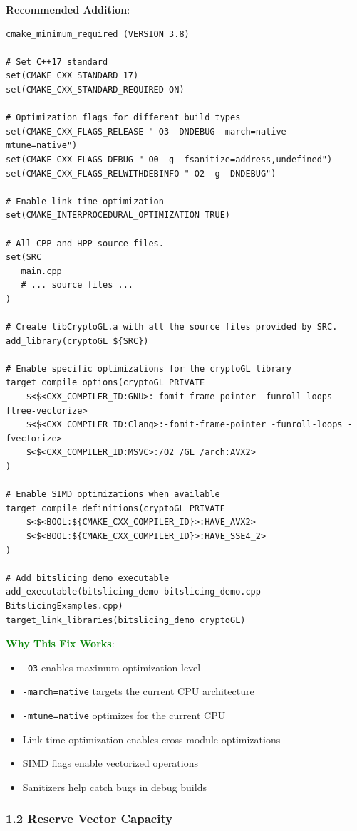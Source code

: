 \documentclass[11pt,a4paper]{article}
\begin{document}
\textbf{Recommended Addition}:
\begin{lstlisting}
cmake_minimum_required (VERSION 3.8)

# Set C++17 standard
set(CMAKE_CXX_STANDARD 17)
set(CMAKE_CXX_STANDARD_REQUIRED ON)

# Optimization flags for different build types
set(CMAKE_CXX_FLAGS_RELEASE "-O3 -DNDEBUG -march=native -mtune=native")
set(CMAKE_CXX_FLAGS_DEBUG "-O0 -g -fsanitize=address,undefined")
set(CMAKE_CXX_FLAGS_RELWITHDEBINFO "-O2 -g -DNDEBUG")

# Enable link-time optimization
set(CMAKE_INTERPROCEDURAL_OPTIMIZATION TRUE)

# All CPP and HPP source files.
set(SRC
   main.cpp
   # ... source files ...
)

# Create libCryptoGL.a with all the source files provided by SRC.
add_library(cryptoGL ${SRC})

# Enable specific optimizations for the cryptoGL library
target_compile_options(cryptoGL PRIVATE
    $<$<CXX_COMPILER_ID:GNU>:-fomit-frame-pointer -funroll-loops -ftree-vectorize>
    $<$<CXX_COMPILER_ID:Clang>:-fomit-frame-pointer -funroll-loops -fvectorize>
    $<$<CXX_COMPILER_ID:MSVC>:/O2 /GL /arch:AVX2>
)

# Enable SIMD optimizations when available
target_compile_definitions(cryptoGL PRIVATE
    $<$<BOOL:${CMAKE_CXX_COMPILER_ID}>:HAVE_AVX2>
    $<$<BOOL:${CMAKE_CXX_COMPILER_ID}>:HAVE_SSE4_2>
)

# Add bitslicing demo executable
add_executable(bitslicing_demo bitslicing_demo.cpp BitslicingExamples.cpp)
target_link_libraries(bitslicing_demo cryptoGL)
\end{lstlisting}

\textcolor{green}{\textbf{Why This Fix Works}}:
\begin{itemize}
    \item \texttt{-O3} enables maximum optimization level
    \item \texttt{-march=native} targets the current CPU architecture
    \item \texttt{-mtune=native} optimizes for the current CPU
    \item Link-time optimization enables cross-module optimizations
    \item SIMD flags enable vectorized operations
    \item Sanitizers help catch bugs in debug builds
\end{itemize}

\subsubsection{1.2 Reserve Vector Capacity}
\end{document}
